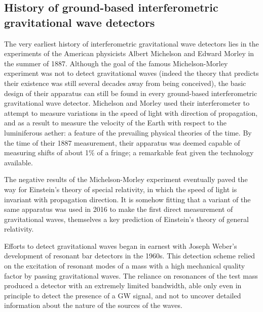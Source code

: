 \newpage

\subsection{History of ground-based interferometric gravitational wave detectors}\label{subsec:prehistory}

The very earliest history of interferometric gravitational wave detectors lies in the experiments 
of the American physicists Albert Michelson and Edward Morley in the summer of 1887. Although 
the goal of the famous Michelson-Morley experiment was not to detect gravitational waves (indeed 
the theory that predicts their existence was still several decades away from being conceived), the basic 
design of their apparatus can still be found in every ground-based interferometric gravitational wave detector. 
Michelson and Morley used their interferometer to attempt to measure variations in the speed of 
light with direction of propagation, and as a result to measure the velocity of the Earth with respect to the 
luminiferous aether: a feature of the prevailing physical theories of the time. By the time of their 1887 measurement, 
their apparatus was deemed capable of measuring shifts of about 1\% of a fringe; a remarkable feat given the 
technology available. 

The negative results of the Michelson-Morley experiment eventually paved the way for Einstein's theory of special 
relativity, in which the speed of light is invariant with propagation direction. It is somehow fitting that a variant 
of the same apparatus was used in 2016 to make the first direct measurement of gravitational waves, themselves 
a key prediction of Einstein's theory of general relativity. 


Efforts to detect gravitational waves began in earnest with Joseph Weber's development of resonant bar detectors 
in the 1960s. This detection scheme relied on the excitation of resonant modes of a mass with a high mechanical 
quality factor by passing gravitational waves. The reliance on resonances of the test mass produced a detector 
with an extremely limited bandwidth, able only even in principle to detect the presence of a GW signal, and not 
to uncover detailed information about the nature of the sources of the waves. 

